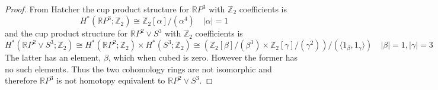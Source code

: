 \documentclass[10pt]{article}
\newcommand{\bb}[1]{\mathbb{#1}}
\theoremstyle{remark}
\begin{document}
\begin{proof}
  From Hatcher the cup product structure for $\bb{R}P^3$ with $\bb{Z}_2$ coefficients
  is
  \[
    H^*(\bb{R}P^3;\bb{Z}_2)\cong \bb{Z}_2[\alpha]/(\alpha^4)\quad |\alpha|=1
  \]
  and the cup product structure for $\bb{R}P^2\vee S^3$ with $\bb{Z}_2$ coefficients is
  \[
    H^*(\bb{R}P^2\vee S^3;\bb{Z}_2)\cong H^*(\bb{R}P^2;\bb{Z}_2)\times H^*(S^3;\bb{Z}_2)
    \cong(\bb{Z}_2[\beta]/(\beta^3)\times\bb{Z}_2[\gamma]/(\gamma^2))/(\langle 1_\beta,1_\gamma\rangle)\quad |\beta|=1,|\gamma|=3
  \]
  The latter has an element, $\beta$, which when cubed is zero. However the former
  has no such elements. Thus the two cohomology rings are not isomorphic
  and therefore $\bb{R}P^3$ is not homotopy equivalent to $\bb{R}P^2\vee S^3$.
\end{proof}
\end{document}
